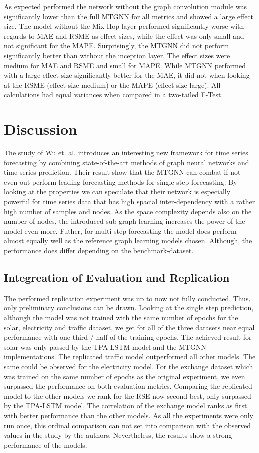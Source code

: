 \documentclass[letterpaper,twocolumn,11pt]{article}
\begin{document}
As expected performed the network without the  graph convolution module was significantly lower than the full MTGNN for all metrics and showed a large effect size.
The model without the Mix-Hop layer performed significantly worse with regards to MAE and RSME as effect sizes, while the effect was only small  and not significant for the MAPE.
Surprisingly, the MTGNN did not perform significantly better than without the inception layer. The effect sizes were medium for MAE and RSME and small for MAPE.
While MTGNN performed with a large effect size significantly better for the MAE, it did not when looking at the RSME (effect size medium) or the MAPE (effect size large).
All calculations had equal variances when compared in a two-tailed F-Test.

    \section{Discussion}
	The study of Wu et. al. introduces an interesting new framework for time series forecasting by combining state-of-the-art methods of graph neural networks and time series prediction.
    Their result show that the MTGNN can combat if not even out-perform leading forecasting methods for single-step forecasting. By looking at the properties we can speculate that their network is especially powerful for time series data that has high spacial inter-dependency with a rather high number of samples and nodes.
    As the space complexity depends also on the number of nodes,  the introduced sub-graph learning increases the power of the model even more.
   Futher, for multi-step forecasting the model does perform almost equally well as the reference graph learning models chosen. Although, the performance does differ depending on the benchmark-dataset.

    \subsection{Integreation of Evaluation and Replication}
The performed replication experiment was up to now not fully conducted. Thus, only preliminary conclusions can be drawn.
Looking at the single step prediction, although the model was not trained with the same number of epochs for the solar, electricity and traffic dataset, we get for all of the three datasets near equal performance with one third / half of the training epochs.
The achieved result for solar was only passed by the TPA-LSTM model and the MTGNN implementations. The replicated traffic model outperformed all other models. The same could be observed for the electricity model.
For the exchange dataset which was trained on the same number of epochs as the original experiment, we even surpassed the performance on both evaluation metrics. Comparing the replicated model to the other models we rank for the RSE now second best, only surpassed by the TPA-LSTM model. The correlation of the exchange model ranks as first with better performance than the other models.
As all the experiments were only run once, this ordinal comparison can not set into comparison with the observed values in the study by the authors. Nevertheless, the results show a strong performance of the models.
\end{document}
